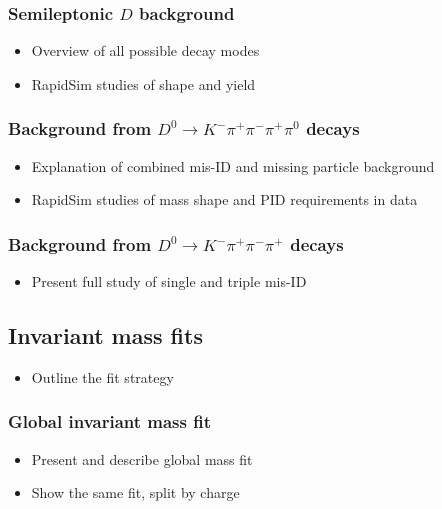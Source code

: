 \documentclass[12pt, a4paper, notitlepage, onecolumn]{article}
\begin{document}
\subsubsection{Semileptonic \texorpdfstring{$D$}{D} background}
  \begin{itemize}[nosep]
    \setlength{\itemindent}{2.5em}
    \item[\textasteriskcentered]{Overview of all possible decay modes}
    \item[\textasteriskcentered]{RapidSim studies of shape and yield}
  \end{itemize}
\subsubsection{Background from \texorpdfstring{$D^0\to K^-\pi^+\pi^-\pi^+\pi^0$}{D02Kpipipipi0} decays}
  \begin{itemize}[nosep]
    \setlength{\itemindent}{2.5em}
    \item[\textasteriskcentered]{Explanation of combined mis-ID and missing particle background}
    \item[\textasteriskcentered]{RapidSim studies of mass shape and PID requirements in data}
  \end{itemize}
\subsubsection{Background from \texorpdfstring{$D^0\to K^-\pi^+\pi^-\pi^+$}{D02Kpipipi} decays}
  \begin{itemize}[nosep]
    \setlength{\itemindent}{2.5em}
    \item[\textasteriskcentered]{Present full study of single and triple mis-ID}
  \end{itemize}
\subsection{Invariant mass fits}
  \begin{itemize}[nosep]
    \setlength{\itemindent}{2em}
    \item[\textendash]{Outline the fit strategy}
  \end{itemize}
\subsubsection{Global invariant mass fit}
  \begin{itemize}[nosep]
    \setlength{\itemindent}{2.5em}
    \item[\textasteriskcentered]{Present and describe global mass fit}
    \item[\textasteriskcentered]{Show the same fit, split by charge}
  \end{itemize}
\end{document}
